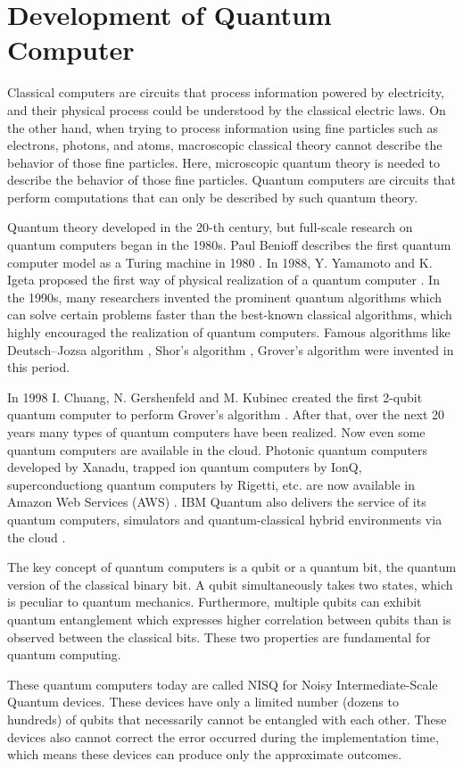 \section{Development of Quantum Computer}
\par Classical computers are circuits that process information powered by electricity, and their physical process could be understood by the classical electric laws. On the other hand, when trying to process information using fine particles such as electrons, photons, and atoms, macroscopic classical theory cannot describe the behavior of those fine particles. Here, microscopic quantum theory is needed to describe the behavior of those fine particles. Quantum computers are circuits that perform computations that can only be described by such quantum theory. 

\par Quantum theory developed in the 20-th century, but full-scale research on quantum computers began in the 1980s. Paul Benioff describes the first quantum computer model as a Turing machine in 1980 \cite{Benioff}. In 1988, Y. Yamamoto and K. Igeta proposed the first way of physical realization of a quantum computer \cite{yamamoto}. In the 1990s, many researchers invented the prominent quantum algorithms which can solve certain problems faster than the best-known classical algorithms, which highly encouraged the realization of quantum computers. Famous algorithms like Deutsch–Jozsa algorithm \cite{deutsch}, Shor's algorithm \cite{shor}, Grover's algorithm \cite{grover} were invented in this period. 

\par In 1998 I. Chuang, N. Gershenfeld and M. Kubinec created the first 2-qubit quantum computer to perform Grover’s algorithm \cite{2quFirst}. After that, over the next 20 years many types of quantum computers have been realized. Now even some quantum computers are available in the cloud. Photonic quantum computers developed by Xanadu, trapped ion quantum computers by IonQ, superconductiong quantum computers by Rigetti, etc. are now available in Amazon Web Services (AWS) \cite{AWS}. IBM Quantum also delivers the service of its quantum computers, simulators and quantum-classical hybrid environments via the cloud \cite{ibmq}.

\par The key concept of quantum computers is a qubit or a quantum bit, the quantum version of the classical binary bit. A qubit simultaneously takes two states, which is peculiar to quantum mechanics. Furthermore, multiple qubits can exhibit quantum entanglement which expresses higher correlation between qubits than is observed between the classical bits. These two properties are fundamental for quantum computing.

\par These quantum computers today are called NISQ for Noisy Intermediate-Scale Quantum devices. These devices have only a limited number (dozens to hundreds) of qubits that necessarily cannot be entangled with each other. These devices also cannot correct the error occurred during the implementation time, which means these devices can produce only the approximate outcomes.
